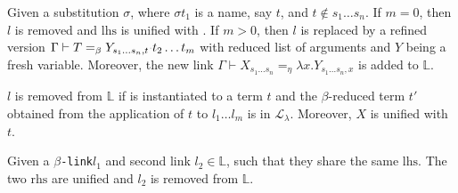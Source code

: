 \documentclass[sigconf,natbib=false,review]{acmart}
\newcommand{\appsep}{\ensuremath{\textcolor{lightgray}{\cdot}}}
\newcommand{\llambda}{\ensuremath{\mathcal{L}_\lambda}\xspace}
\newcommand{\linkMacro}[1]{\ensuremath{#1}\texttt{-link}\xspace}
\newcommand{\linkbeta}{\linkMacro{\beta}}
\newcommand{\linketaM}[3]{\ensuremath{#1 \vdash #2 =_\eta #3}}
\newcommand{\linkbetaM}[3]{\ensuremath{#1 \vdash #2 =_\beta #3}}
\newcommand{\lhs}{\ensuremath{\mathrm{lhs}}\xspace}
\newcommand{\rhs}{\ensuremath{\mathrm{rhs}}\xspace}
\newcommand{\linkStore}{\ensuremath{\mathbb{L}}\xspace}
\begin{document}
\begin{definition}[\progBetaLL]
  Given a substitution $\sigma$, where $\sigma t_1$ is a name, say $t$, and
  $t\notin s_1\dots s_n$. If $m = 0$, then $l$ is removed and \lhs is
  unified with \rhsBetaHead. If $m > 0$, then $l$ is replaced by a
  refined version $\linkbetaM{\Gamma}{T}{Y_{s_1\dots s_n,t}\appsep t_2\dots
  t_m}$ with reduced list of arguments and $Y$ being a fresh variable. Moreover,
  the new link \linketaM{\Gamma}{X_{s_1\dots s_n}}{\lambda x.Y_{s_1\dots s_n,x}}
  is added to \linkStore.

  \label{def:progBetaLL}
\end{definition}

\begin{definition}[\progBetaRH]
  $l$ is removed from
  \linkStore if \rhsBetaHead is instantiated to a term $t$ and the
  $\beta$-reduced term $t'$ obtained from the application of $t$ to
  $l_1\dots l_m$ is in \llambda. Moreover, $X$ is unified with $t$.
  \label{def:progBetaRH}
\end{definition}

\begin{definition}[\progBetaDedup]
  Given a \linkbeta $l_1$ and second link $l_2 \in\linkStore$, such that they
  share the same \lhs. The two \rhs are unified and $l_2$ is
  removed from \linkStore.
  \label{def:progBetaDedup}
\end{definition}
\end{document}
